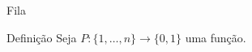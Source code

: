 \begin{frame}{Fila}

    \begin{block}{Definição}
        Seja $P: \{1, \dots, n\} \to \{0, 1\}$ uma função.
    \end{block}


    

\end{frame}

